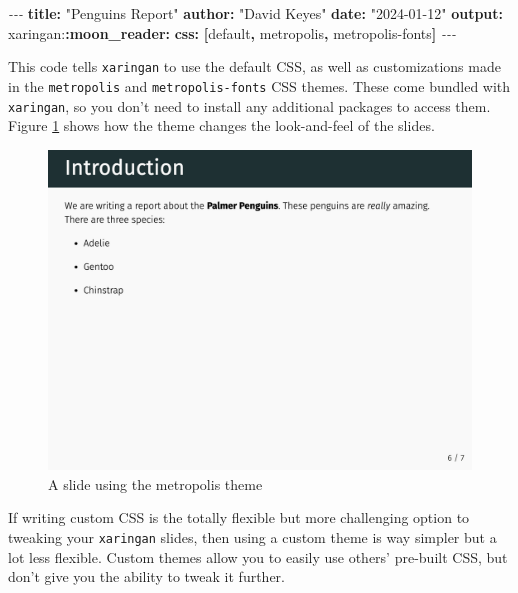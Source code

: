 \documentclass[
]{book}
\newenvironment{Shaded}{\begin{snugshade}}{\end{snugshade}}
\newcommand{\AttributeTok}[1]{\textcolor[rgb]{0.13,0.29,0.53}{#1}}
\newcommand{\FunctionTok}[1]{\textcolor[rgb]{0.13,0.29,0.53}{\textbf{#1}}}
\newcommand{\KeywordTok}[1]{\textcolor[rgb]{0.13,0.29,0.53}{\textbf{#1}}}
\newcommand{\PreprocessorTok}[1]{\textcolor[rgb]{0.56,0.35,0.01}{\textit{#1}}}
\newcommand{\StringTok}[1]{\textcolor[rgb]{0.31,0.60,0.02}{#1}}
\begin{document}
\begin{Shaded}
\begin{Highlighting}[]
\PreprocessorTok{{-}{-}{-}}
\FunctionTok{title}\KeywordTok{:}\AttributeTok{ }\StringTok{"Penguins Report"}
\FunctionTok{author}\KeywordTok{:}\AttributeTok{ }\StringTok{"David Keyes"}
\FunctionTok{date}\KeywordTok{:}\AttributeTok{ }\StringTok{"2024{-}01{-}12"}
\FunctionTok{output}\KeywordTok{:}
\AttributeTok{  xaringan:}\FunctionTok{:moon\_reader}\KeywordTok{:}
\AttributeTok{    }\FunctionTok{css}\KeywordTok{:}\AttributeTok{ }\KeywordTok{[}\AttributeTok{default}\KeywordTok{,}\AttributeTok{ metropolis}\KeywordTok{,}\AttributeTok{ metropolis{-}fonts}\KeywordTok{]}
\PreprocessorTok{{-}{-}{-}}
\end{Highlighting}
\end{Shaded}

This code tells \texttt{xaringan} to use the default CSS, as well as customizations made in the \texttt{metropolis} and \texttt{metropolis-fonts} CSS themes. These come bundled with \texttt{xaringan}, so you don't need to install any additional packages to access them. Figure \ref{fig:xaringan-metropolis} shows how the theme changes the look-and-feel of the slides.

\begin{figure}
\includegraphics[width=1\linewidth]{assets/xaringan-metropolis} \caption{A slide using the metropolis theme}\label{fig:xaringan-metropolis}
\end{figure}

If writing custom CSS is the totally flexible but more challenging option to tweaking your \texttt{xaringan} slides, then using a custom theme is way simpler but a lot less flexible. Custom themes allow you to easily use others' pre-built CSS, but don't give you the ability to tweak it further.
\end{document}

